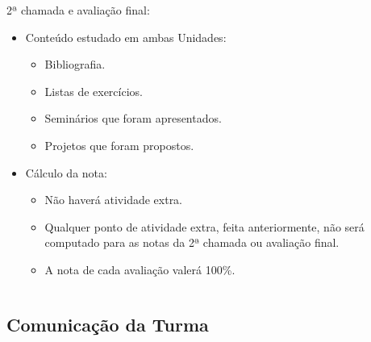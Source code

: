 \begin{frame}[t]
\begin{columns}[onlytextwidth,T]
    \begin{column}{0.48\linewidth}
        \begin{block}{2ª chamada e avaliação final:}
          \begin{itemize}
            \justifying{}
            \item Conteúdo estudado em ambas Unidades:
            \begin{itemize}
              \justifying{}
              \item Bibliografia.
              \item Listas de exercícios.
              \item Seminários que foram apresentados.
              \item Projetos que foram propostos.
            \end{itemize}
            \item Cálculo da nota:
            \begin{itemize}
              \justifying{}
              \item Não haverá atividade extra.
              \item Qualquer ponto de atividade extra, feita anteriormente, não será computado para as notas da 2ª chamada ou avaliação final.
              \item A nota de cada avaliação valerá 100\%.
            \end{itemize}
          \end{itemize}
        \end{block}
    \end{column}

  \end{columns}

\end{frame}



\subsection[Comunicação da Turma]{Comunicação da Turma}\label{subsec:planejamento-comunicacao-turma}



